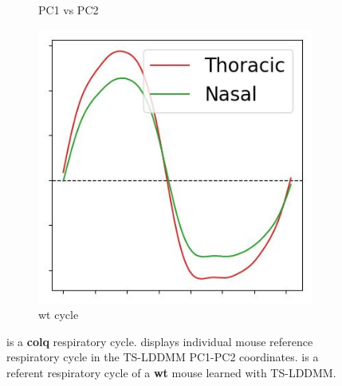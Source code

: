 \begin{figure}
\begin{subfigure}[b]{0.16\textwidth}
    \caption{PC1 vs PC2}
    \label{fig: pcs-scatter}
  \end{subfigure}
  \begin{subfigure}[b]{0.16\textwidth}
    \centering
    \includegraphics[width = \textwidth]{pictures/exp_1_wt.jpeg}
    \caption{wt cycle}
    \label{fig:wt-reference}
  \end{subfigure}
  \caption{ is a \textbf{colq} respiratory cycle.  displays individual mouse reference respiratory cycle in the TS-LDDMM PC1-PC2 coordinates.  is a referent respiratory cycle of a \textbf{wt} mouse learned with TS-LDDMM. }
  \vspace{-1em}
\end{figure}



